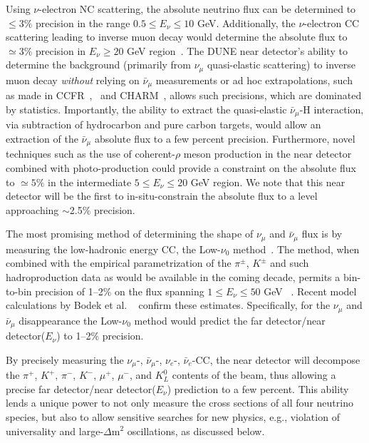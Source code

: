 
Using  $\nu$-electron NC scattering, the absolute neutrino flux can be determined 
to $\leq 3\%$ precision in the range $0.5 \leq E_\nu \leq 10$ GeV. Additionally, the $\nu$-electron CC scattering leading to  inverse 
muon decay would determine the absolute flux to $\simeq 3\%$ precision in $E_\nu \geq 20$ GeV region~\cite{ABS-FLUX}. 
The DUNE near detector's ability to determine the background (primarily from $\nu_{\mu}$ quasi-elastic scattering) 
to inverse muon decay \textit{without} relying on $\bar \nu_\mu$ measurements or 
ad hoc extrapolations, such as made in CCFR~\cite{CCFR-IMD-Mishra-89},~\cite{CCFR-IMD-Mishra-90} 
and CHARM~\cite{CHARM-IMD-95}, allows such precisions, which are dominated by statistics. 
Importantly, the ability to extract the quasi-elastic 
$\bar \nu_\mu$-H interaction, via subtraction of hydrocarbon and pure carbon targets, would allow an extraction of 
the $\bar \nu_\mu$ absolute flux to a few percent precision. Furthermore, novel techniques such as the use of 
coherent-$\rho$ meson production in the near detector combined with photo-production could provide a constraint 
on the absolute flux to $\simeq 5\%$ in the intermediate $5 \leq E_\nu \leq 20$ GeV region. 
We note that this near detector will be the first %
to in-situ-constrain the absolute flux to a level approaching $\sim$2.5\% precision. 

The most promising method of determining 
the shape of  $\nu_\mu$ and $\bar \nu_\mu$ flux is by measuring the low-hadronic energy CC, the Low-$\nu_0$
method~\cite{MISHRA-Nu0}. The method, when combined with the empirical parametrization of the $\pi^{\pm}$, $K^{\pm}$ 
and such hadroproduction data as would be available in the coming decade, permits a bin-to-bin precision of 1--2\% on 
the flux spanning $1 \leq E_\nu \leq 50$ GeV ~\cite{near-detector-REL-FLUX}. 
Recent model calculations by Bodek et al. ~\cite{Bodek:2012uu} confirm these estimates. 
Specifically, for the $\nu_\mu$ and $\bar \nu_\mu$ disappearance the Low-$\nu_0$ method would predict the 
far detector/near detector($E_\nu$) to 1--2\% precision. 

By precisely measuring the $\nu_\mu$-, $\bar \nu_\mu$-, $\nu_e$-, $\bar \nu_e$-CC, 
the near detector will decompose the $\pi^+$, $K^+$, $\pi^-$, $K^-$, $\mu^+$, $\mu^-$, and $K^0_L$ contents of the beam, thus 
allowing a precise far detector/near detector($E_\nu$) prediction to a few percent.  This ability lends a unique power to 
not only measure the cross sections of all four neutrino species, but also to allow sensitive searches for new 
physics, e.g., violation of universality and large-$\Delta$m$^2$ oscillations, as discussed %
below. 

